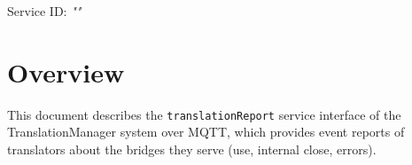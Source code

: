 \documentclass[a4paper]{arrowhead}
\begin{document}
\sloppy

\ArrowheadSetup

\begin{center}
  \vspace*{1cm}
  \huge{\arrowtitle}

  \vspace*{0.2cm}
  \LARGE{\arrowtype}
  \vspace*{1cm}

  \Large{Service ID: \textit{"\arrowid"}}

  \vspace*{\fill}


  \vspace*{1cm}
  \vspace*{\fill}

  \begin{abstract}
    This document describes the MQTT protocol with TLS payload security and JSON payload encoding variant of the \texttt{translationReport} service of the TranslationManager system.
  \end{abstract}

  \vspace*{1cm}
\end{center}

\newpage

\tableofcontents
\newpage

\section{Overview}
\label{sec:overview}

This document describes the \texttt{translationReport} service interface of the TranslationManager system over MQTT, which provides event reports of translators about the bridges they serve (use, internal close, errors).
\end{document}
